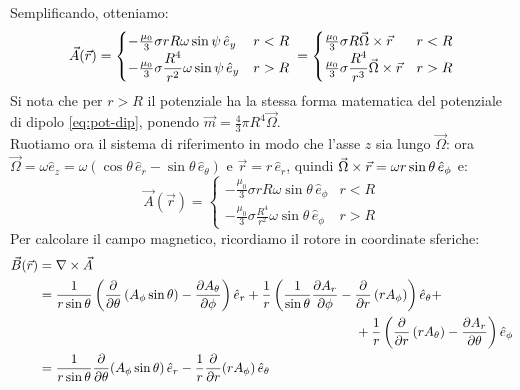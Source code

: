 Semplificando, otteniamo:
\begin{equation}
	\vec{A}(\vec{r}) =
	\begin{cases}
		-\frac{\mu_0}{3} \sigma r R \omega \sin\psi \,\hat{e}_y & r < R \\ 
		-\frac{\mu_0}{3} \sigma \displaystyle\frac{R^4}{r^2} \omega \sin\psi \,\hat{e}_y & r > R
	\end{cases}
	\,=
	\begin{cases}
		\frac{\mu_0}{3} \sigma R \vec{\Omega}\times\vec{r} & r < R \\ 
		\frac{\mu_0}{3} \sigma \displaystyle\frac{R^4}{r^3} \vec{\Omega}\times\vec{r} & r > R
	\end{cases}
	\label{eq:po-sf}
\end{equation}
Si nota che per $ r > R $ il potenziale ha la stessa forma matematica del potenziale di dipolo \ref{eq:pot-dip}, ponendo $ \vec{m} = \frac{4}{3} \pi R^4 \vec{\Omega} $. \\ 
%
Ruotiamo ora il sistema di riferimento in modo che l'asse $ z $ sia lungo $ \vec{\Omega} $: ora $ \vec{\Omega} = \omega \hat{e}_z = \omega (\cos\theta \,\hat{e}_r - \sin\theta \,\hat{e}_{\theta}) $ e $ \vec{r} = r \,\hat{e}_r $, quindi $ \vec{\Omega}\times\vec{r} = \omega r \sin\theta \,\hat{e}_{\phi} $ e:
\begin{equation}
	\vec{A}(\vec{r}) =
	\begin{cases}
		-\frac{\mu_0}{3} \sigma r R \omega \sin\theta \,\hat{e}_{\phi} & r < R \\ 
		-\frac{\mu_0}{3} \sigma \displaystyle\frac{R^4}{r^2} \omega \sin\theta \,\hat{e}_{\phi} & r > R
	\end{cases}
	\label{eq:}
\end{equation}
Per calcolare il campo magnetico, ricordiamo il rotore in coordinate sferiche:
\begin{equation}
	\begin{split}
		\vec{B}(\vec{r}) &= \nabla\times\vec{A} \\ 
				 &= \displaystyle\frac{1}{r\sin\theta} \left( \displaystyle\frac{\partial}{\partial\theta} \left( A_{\phi} \sin\theta \right) - \displaystyle\frac{\partial A_{\theta}}{\partial\phi} \right) \hat{e}_r + \displaystyle\frac{1}{r} \left( \displaystyle\frac{1}{\sin\theta} \displaystyle\frac{\partial A_r}{\partial\phi} - \displaystyle\frac{\partial}{\partial r} \left(r A_{\phi} \right)\right) \hat{e}_{\theta} + \\ 
				 & \qquad\qquad\qquad\qquad\qquad\qquad\qquad\qquad\qquad\qquad\qquad\qquad + \displaystyle\frac{1}{r} \left(\displaystyle\frac{\partial}{\partial r} \left( r A_{\theta} \right) - \displaystyle\frac{\partial A_r}{\partial\theta} \right) \hat{e}_{\phi} \\ 
				 &= \displaystyle\frac{1}{r\sin\theta}\displaystyle\frac{\partial}{\partial\theta}(A_{\phi} \sin\theta) \,\hat{e}_r - \displaystyle\frac{1}{r}\displaystyle\frac{\partial}{\partial r} (rA_{\phi}) \,\hat{e}_{\theta}
	\end{split}
	\label{eq:}
\end{equation}
